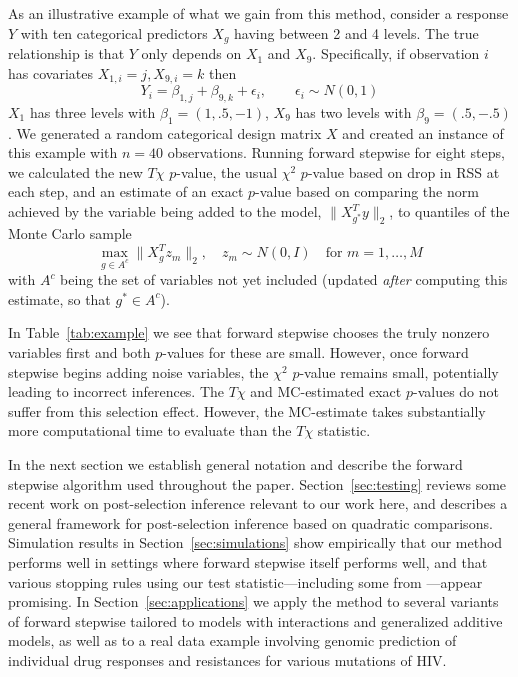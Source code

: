 \documentclass{imsart}
\begin{document}
As an illustrative example of what we gain from this method,
consider a response $Y$ with ten
categorical predictors $X_g$ having between 2 and 4 levels. The true 
relationship is that $Y$ only depends on $X_1$ and $X_9$. Specifically,
if observation $i$ has covariates $X_{1,i} = j, X_{9,i} = k$ then
\[
    Y_i = \beta_{1,j} + \beta_{9,k} + \epsilon_i , \qquad
    \epsilon_i \sim N(0,1)
\]
$X_1$ has three levels with $\beta_1 = (1, .5, -1)$, $X_9$
has two levels with $\beta_9 = (.5, -.5)$. We generated a random
categorical design matrix $X$ and created an instance of this example
with $n = 40$ observations. Running forward stepwise for eight steps,
we calculated the new $T\chi$ $p$-value, the usual
$\chi^2$ $p$-value based on drop in RSS at each step,
and an estimate of an exact $p$-value based on comparing the norm
achieved by the variable being added to the model, $\| X_{g^*}^T y \|_2$,
to quantiles of the Monte Carlo sample
\[
\max_{g \in A^c} \| X_g^T z_m \|_2, \quad z_m \sim N(0, I) \quad \text{for } m = 1,\ldots,M
\]
with $A^c$ being the set of variables not yet included
(updated \textit{after} computing this estimate, so that $g^* \in A^c$).



In Table~\ref{tab:example} we see that forward stepwise chooses the
truly nonzero variables first and both $p$-values for these are small.
However, once forward stepwise begins adding noise variables, the
$\chi^2$ $p$-value remains small, potentially leading to 
incorrect inferences. The $T\chi$ and MC-estimated exact $p$-values
do not suffer from this selection effect.
However, the MC-estimate takes substantially more computational time to evaluate than the $T\chi$ statistic.

In the next section we establish general notation and describe the
forward stepwise algorithm used throughout the paper.
Section~\ref{sec:testing} reviews some recent work on
post-selection inference
\citep{significance:lasso,tests:adaptive,lasso:fixed}
relevant to our work here, and describes a general framework
for post-selection inference based on quadratic comparisons.
Simulation results in Section~\ref{sec:simulations} show
empirically that our method performs well in settings where forward
stepwise itself performs well, and that
various stopping rules using our test statistic---including
some from \cite{sequential:fdr}---appear promising. In
Section~\ref{sec:applications} we apply
the method to several variants of forward
stepwise tailored to models with interactions and generalized additive
models, as well as to a real data example involving genomic prediction
of individual drug responses and resistances for various mutations of HIV.
\end{document}
